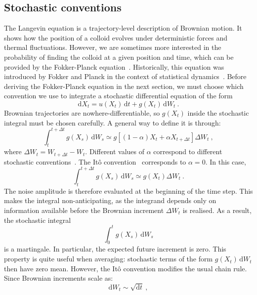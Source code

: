 \subsection{Stochastic conventions}
\label{sec:ito}
The Langevin equation is a trajectory-level description of Brownian motion. It shows how the position of a colloid evolves under deterministic forces and thermal fluctuations. However, we are sometimes more interested in the probability of finding the colloid at a given position and time, which can be provided by the Fokker-Planck equation~\cite{Risken_1996,Dhont_1996,Gardiner_2009}. Historically, this equation was introduced by Fokker and Planck in the context of statistical dynamics~\cite{Fokker_1914,Planck_1917}. Before deriving the Fokker-Planck equation in the next section, we must choose which convention we use to integrate a stochastic differential equation of the form
\begin{equation}
    \mathrm{d}X_t = u(X_t)\,\mathrm{d}t + g(X_t)\,\mathrm{d}W_t~.
\end{equation}
Brownian trajectories are nowhere-differentiable, so $g(X_t)$ inside the stochastic integral must be chosen carefully. A general way to define it is through:
\begin{equation}
    \int_t^{t+\Delta t} g(X_s)\,\mathrm{d}W_s
    \simeq
    g\left[(1-\alpha)X_t+\alpha X_{t+\Delta t}\right]\Delta W_t~,
\end{equation}
where $\Delta W_t = W_{t+\Delta t}-W_t$. Different values of $\alpha$ correspond to different stochastic conventions~\cite{karatzas_brownian_1991}. The Itô convention~\cite{Ito_1944} corresponds to $\alpha=0$. In this case,
\begin{equation}
    \int_t^{t+\Delta t} g(X_s)\,\mathrm{d}W_s
    \simeq
    g(X_t)\Delta W_t~.
\end{equation}
The noise amplitude is therefore evaluated at the beginning of the time step. This makes the integral non-anticipating, as the integrand depends only on information available before the Brownian increment $\Delta W_t$ is realised. As a result, the stochastic integral
\begin{equation}
    \int_0^t g(X_s)\,\mathrm{d}W_s
\end{equation}
is a martingale. In particular, the expected future increment is zero. This property is quite useful when averaging: stochastic terms of the form $g(X_t)\,\mathrm{d}W_t$ then have zero mean. However, the Itô convention modifies the usual chain rule. Since Brownian increments scale as:
\begin{equation}
    \mathrm{d}W_t \sim \sqrt{\mathrm{d}t}~,
\end{equation}
